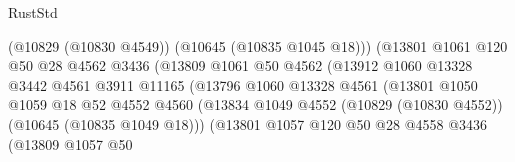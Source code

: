 \begin{lexlean}{RustStd}
\begin{coremodule}
                                            (@10829 (@10830 @4549))
                                            (@10645 (@10835 @1045 @18)))
                                          (@13801
                                            @1061
                                            @120
                                            @50
                                            @28
                                            @4562
                                            @3436
                                            (@13809
                                              @1061
                                              @50
                                              @4562
                                              (@13912
                                                @1060
                                                @13328
                                                @3442
                                                @4561
                                                @3911
                                                @11165
                                                (@13796
                                                  @1060
                                                  @13328
                                                  @4561
                                                  (@13801
                                                    @1050
                                                    @1059
                                                    @18
                                                    @52
                                                    @4552
                                                    @4560
                                                    (@13834
                                                      @1049
                                                      @4552
                                                      (@10829 (@10830 @4552))
                                                      (@10645 (@10835 @1049 @18)))
                                                    (@13801
                                                      @1057
                                                      @120
                                                      @50
                                                      @28
                                                      @4558
                                                      @3436
                                                      (@13809
                                                        @1057
                                                        @50

\end{coremodule}
\end{lexlean}
